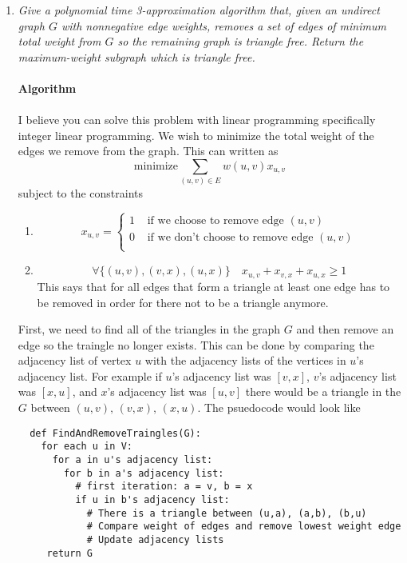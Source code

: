\documentclass[12pt]{article}
\begin{document}
\begin{enumerate}
  \newpage
  \item \textit{Give a polynomial time 3-approximation algorithm that, given an
  undirect graph $G$ with nonnegative edge weights, removes a set of edges of
  minimum total weight from $G$ so the remaining graph is triangle free. 
  Return the maximum-weight subgraph which is triangle free.}\\
  \\
  \textbf{Algorithm}\\
  \\
  I believe you can solve this problem with linear programming specifically
  integer linear programming.
  We wish to minimize the total weight of the edges we remove from the graph.  
  This can
  written as
  $$
  \text{minimize} \sum_{(u,v) \in E} w(u,v)x_{u,v}
  $$
  subject to the constraints
  \begin{enumerate}
  \item
  $$
  x_{u,v} = 
  \begin{cases}
  1 & \text{ if we choose to remove edge }(u,v)\\
  0 & \text{ if we don't choose to remove edge }(u,v)\\
  \end{cases}
  $$ 
  
  \item
  $$
  \forall\{(u,v),(v,x),(u,x)\} \quad x_{u,v} + x_{v,x} + x_{u,x} \ge 1
  $$
  This says that for all edges that form a triangle at least one edge has to be
  removed in order for there not to be a triangle anymore.
  \end{enumerate}
  First, we need to find all of the triangles in the graph $G$ and then remove
  an edge so the traingle no longer exists.
  This can be done by comparing the adjacency list of vertex $u$ with the
  adjacency lists of the vertices in $u$'s adjacency list.  For example if $u$'s
  adjacency list was $[v,x]$, $v$'s adjacency list was $[x,u]$, and $x$'s
  adjacency list was $[u,v]$ there would be a triangle in the $G$ between
  $(u,v),\,(v,x),\,(x,u)$.  The psuedocode would look like
  \begin{verbatim}
  def FindAndRemoveTraingles(G):
    for each u in V:
      for a in u's adjacency list:
        for b in a's adjacency list:
          # first iteration: a = v, b = x
          if u in b's adjacency list:
            # There is a triangle between (u,a), (a,b), (b,u)
            # Compare weight of edges and remove lowest weight edge
            # Update adjacency lists
     return G
  \end{verbatim}
  

\end{enumerate}
\end{document}
